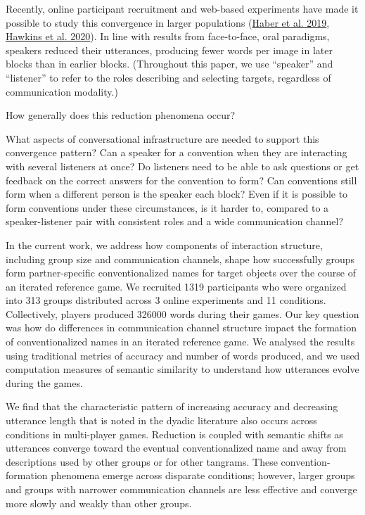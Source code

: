 \documentclass[
  english,
  a4paper,
]{article}
\begin{document}
Recently, online participant recruitment and web-based experiments have made it possible to study this convergence in larger populations (\protect\hyperlink{ref-haber2019}{Haber et al. 2019}, \protect\hyperlink{ref-hawkinsCharacterizingDynamicsLearning2020}{Hawkins et al. 2020}). In line with results from face-to-face, oral paradigms, speakers reduced their utterances, producing fewer words per image in later blocks than in earlier blocks. (Throughout this paper, we use ``speaker'' and ``listener'' to refer to the roles describing and selecting targets, regardless of communication modality.)

How generally does this reduction phenomena occur?

What aspects of conversational infrastructure are needed to support this convergence pattern? Can a speaker for a convention when they are interacting with several listeners at once? Do listeners need to be able to ask questions or get feedback on the correct answers for the convention to form? Can conventions still form when a different person is the speaker each block? Even if it is possible to form conventions under these circumstances, is it harder to, compared to a speaker-listener pair with consistent roles and a wide communication channel?

In the current work, we address how components of interaction structure, including group size and communication channels, shape how successfully groups form partner-specific conventionalized names for target objects over the course of an iterated reference game. We recruited 1319 participants who were organized into 313 groups distributed across 3 online experiments and 11 conditions. Collectively, players produced 326000 words during their games. Our key question was how do differences in communication channel structure impact the formation of conventionalized names in an iterated reference game. We analysed the results using traditional metrics of accuracy and number of words produced, and we used computation measures of semantic similarity to understand how utterances evolve during the games.

We find that the characteristic pattern of increasing accuracy and decreasing utterance length that is noted in the dyadic literature also occurs across conditions in multi-player games. Reduction is coupled with semantic shifts as utterances converge toward the eventual conventionalized name and away from descriptions used by other groups or for other tangrams. These convention-formation phenomena emerge across disparate conditions; however, larger groups and groups with narrower communication channels are less effective and converge more slowly and weakly than other groups.
\end{document}
